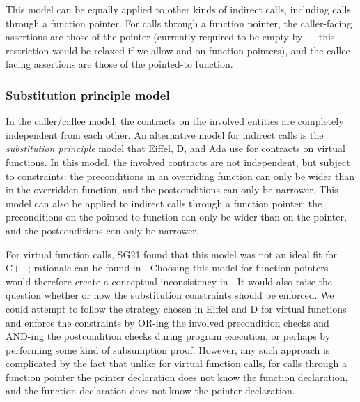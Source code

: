 This model can be equally applied to other kinds of indirect calls, including calls through a function pointer. For calls through a function pointer, the caller-facing assertions are those of the pointer (currently required to be empty by \cite{P2900R8} --- this restriction would be relaxed if we allow  and  on function pointers), and the callee-facing assertions are those of the pointed-to function. 

\subsubsection{Substitution principle model}
\label{submodel}

In the caller/callee model, the contracts on the involved entities are completely independent from each other. An alternative model for indirect calls is the \emph{substitution principle} model that Eiffel, D, and Ada use for contracts on virtual functions. In this model, the involved contracts are not independent, but subject to constraints: the preconditions in an overriding function can only be wider than in the overridden function, and the postconditions can only be narrower. This model can also be applied to indirect calls through a function pointer: the preconditions on the pointed-to function can only be wider than on the pointer, and the postconditions can only be narrower.

For virtual function calls, SG21 found that this model was not an ideal fit for C++; rationale can be found in \cite{P3097R0}. Choosing this model for function pointers would therefore create a conceptual inconsistency in \cite{P2900R8}. It would also raise the question whether or how the substitution constraints should be enforced. We could attempt to follow the strategy chosen in Eiffel and D for virtual functions and enforce the constraints by OR-ing the involved precondition checks and AND-ing the postcondition checks during program execution, or perhaps by performing some kind of subsumption proof. However, any such approach is complicated by the fact that unlike for virtual function calls, for calls through a function pointer the pointer declaration does not know the function declaration, and the function declaration does not know the pointer declaration.

